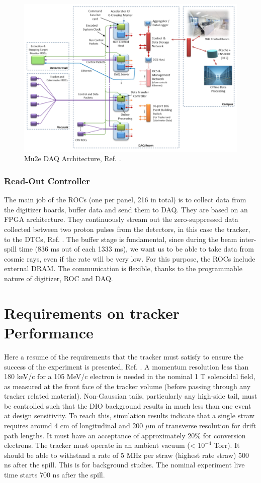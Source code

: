 \begin{figure}[!h]
    \centering
    \includegraphics[width =\textwidth]{figures/png/Screenshot_20240206_144803.png}
    \caption{Mu2e DAQ Architecture, Ref. \cite{GIOIOSA2023167732}.}
    \label{fig:linktodaq}
    \end{figure}
\subsubsection{Read-Out Controller}\label{ROC} 
The main job of the ROCs (one per panel, 216 in total) 
is to collect data from the digitizer boards, buffer data and 
send them to DAQ. They are based on an FPGA architecture. They 
continuously stream out the zero-suppressed data collected between 
two proton pulses from the detectors, in this case the tracker, to 
the DTCs, Ref. \cite{GIOIOSA2023167732}. The buffer 
stage is fundamental, since during the beam inter-spill time (836 ms 
out of each 1333 ms), we want us to be able to take data from cosmic 
rays, even if the rate will be very low. For this purpose, the ROCs 
include external DRAM. The communication is flexible, thanks to the 
programmable nature of digitizer, ROC and DAQ. 

\section{Requirements on tracker Performance}
Here a resume of the requirements that the tracker must satisfy to ensure the success of the experiment is presented, Ref. \cite{trkreq}.
A momentum resolution less than 180 keV/c for a 105 MeV/c electron is needed in the nominal
1 T solenoidal field, as measured at the front face of the tracker volume (before
passing through any tracker related material). Non-Gaussian tails, particularly any
high-side tail, must be controlled such that the DIO background results in much less
than one event at design sensitivity. To reach this, simulation results indicate that 
a single straw requires around 4 cm of longitudinal and 200 $\mu$m of transverse resolution for drift path lengths. 
It must have an acceptance of approximately 20\% for conversion electrons.
The tracker must operate in an ambient vacuum (< $10^{-4}$ Torr).
It should be able to withstand a rate of 5 MHz per straw (highest rate straw) 500 ns after the spill. This is
for background studies. The nominal experiment live time starts 700 ns after the spill.
